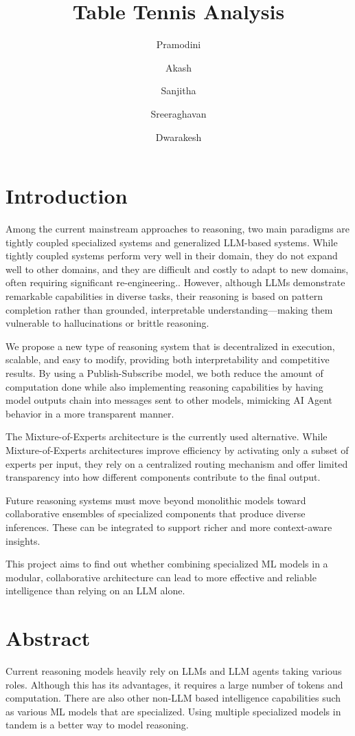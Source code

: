 \documentclass{article}
\title{Table Tennis Analysis}
\author{Pramodini}
\author{Akash}
\author{Sanjitha}
\author{Sreeraghavan}
\author{Dwarakesh}
\affil{Department of Computer Science and Engineering, PSG College of Technology}
\begin{document}
\maketitle

\section{Introduction}
Among the current mainstream approaches to reasoning, two main paradigms are tightly coupled specialized systems and generalized LLM-based systems. While tightly coupled systems perform very well in their domain, they do not expand well to other domains, and they are difficult and costly to adapt to new domains, often requiring significant re-engineering.. However, although LLMs demonstrate remarkable capabilities in diverse tasks, their reasoning is based on pattern completion rather than grounded, interpretable understanding—making them vulnerable to hallucinations or brittle reasoning.

We propose a new type of reasoning system that is decentralized in execution, scalable, and easy to modify, providing both interpretability and competitive results. By using a Publish-Subscribe model, we both reduce the amount of computation done while also implementing reasoning capabilities by having model outputs chain into messages sent to other models, mimicking AI Agent behavior in a more transparent manner.

The Mixture-of-Experts architecture is the currently used alternative. While Mixture-of-Experts architectures improve efficiency by activating only a subset of experts per input, they rely on a centralized routing mechanism and offer limited transparency into how different components contribute to the final output. 

Future reasoning systems must move beyond monolithic models toward collaborative ensembles of specialized components that produce diverse inferences. These can be integrated to support richer and more context-aware insights.

This project aims to find out whether combining specialized ML models in a modular, collaborative architecture can lead to more effective and reliable intelligence than relying on an LLM alone. 

\section{Abstract}

Current reasoning models heavily rely on LLMs and LLM agents taking various roles. Although this has its advantages, it requires a large number of tokens and computation. There are also other non-LLM based intelligence capabilities such as various ML models that are specialized. Using multiple specialized models in tandem is a better way to model reasoning.
\end{document}
